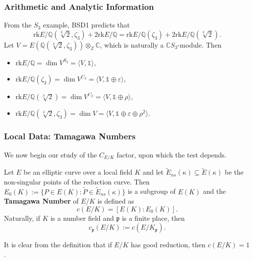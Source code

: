 \documentclass{beamer}
\newcommand{\rk}{\mathrm{rk}}
\newcommand{\CC}{\mathbb{C}}
\newcommand{\QQ}{\mathbb{Q}}
\newcommand{\ZZ}{\mathbb{Z}}
\newcommand{\pp}{\mathfrak{p}}
\theoremstyle{plain}
\begin{document}
\begin{frame}
    \frametitle{Arithmetic and Analytic Information}
    \begin{example}
        From the $S_3$ example, BSD1 predicts that $$\rk E/\QQ(\sqrt[3]{2},\zeta_3)+2\rk E/\QQ=\rk E/\QQ(\zeta_3)+2\rk E/\QQ(\sqrt[3]{2}).$$
        Let $V=E(\QQ(\sqrt[3]{2},\zeta_3))\otimes_\ZZ \CC$, which is naturally a $\CC S_3$-module. Then
        \begin{itemize}
            \item $\rk E/\QQ=\dim V^{S_3}= \langle V,\mathds{1}\rangle$,
            \item $\rk E/\QQ(\zeta_3)=\dim V^{C_3}=\langle V,\mathds{1}\oplus\varepsilon\rangle$,
            \item $\rk E/\QQ(\sqrt[3]{2})=\dim V^{C_2}=\langle V,\mathds{1}\oplus\rho\rangle$,
            \item $\rk E/\QQ(\sqrt[3]{2},\zeta_3)=\dim V=\langle V,\mathds{1}\oplus\varepsilon\oplus\rho^2\rangle$.
        \end{itemize}
    \end{example}

\end{frame}

\begin{frame}
    
\end{frame}

\begin{frame}
    \frametitle{Local Data: Tamagawa Numbers}
    We now begin our study of the $C_{E/K}$ factor, upon which the test depends. 

    \begin{definition}
        Let $E$ be an elliptic curve over a local field $K$ and let $\tilde{E}_{ns}(\kappa)\subseteq \tilde{E}(\kappa)$ be the non-singular points of the reduction curve. Then $E_0(K):=\{P\in E(K):\tilde{P}\in \tilde{E}_{ns}(\kappa)\}$ is a subgroup of $E(K)$ and the \textbf{Tamagawa Number} of $E/K$ is defined as $$c(E/K)=[E(K):E_{0}(K)].$$
        Naturally, if $K$ is a number field and $\pp$ is a finite place, then
        $$c_\pp(E/K):=c(E/K_\pp).$$
    \end{definition}
    It is clear from the definition that if $E/K$ has good reduction, then $c(E/K)=1$.
\end{frame}
\end{document}

